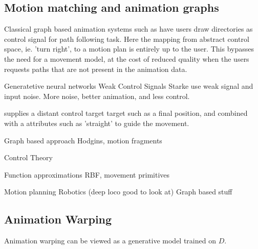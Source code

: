 \subsection{Motion matching and animation graphs}
Classical graph based animation systems such as \citep{treuille07} have users draw directories as control signal for path following task. Here the mapping from abstract control space, ie. 'turn right', to a motion plan is entirely up to the user. This bypasses the need for a movement model, at the cost of reduced quality when the users requests paths that are not present in the animation data.



Generatetive neural networks Weak Control Signals
    Starke use weak signal and input noise. More noise, better animation, and less control.

    \citep{lee18} supplies a distant control target target such as a final position, and combined with a attributes such as 'straight' to guide the movement.

Graph based approach 
    Hodgins, motion fragments

Control Theory

Function approximations 
    RBF, movement primitives

Motion planning
    Robotics (deep loco good to look at)
    Graph based stuff



\subsection{Animation Warping}
Animation warping can be viewed as a generative model trained on $D$. 

